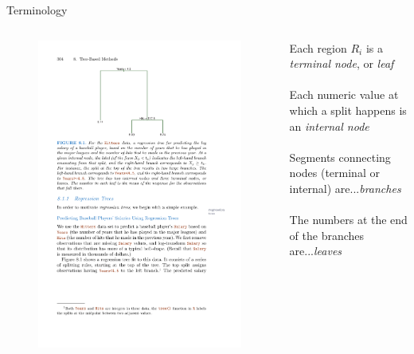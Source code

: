 \documentclass[mathserif, aspectratio=169]{beamer}
\begin{document}
\begin{frame}{Terminology}

\begin{columns}
\begin{figure}
\includegraphics[height=0.65\textheight]{simple_tree}
\caption*{}
\end{figure}



Each region $R_i$ is a \textit{terminal node}, or \textit{leaf}\\~\\

Each numeric value at which a split happens is an \textit{internal node} \\~\\

Segments connecting nodes (terminal or internal) are...\pause \textit{branches}\\~\\

\pause
The numbers at the end of the branches are...\pause \textit{leaves}

\end{columns}
\end{frame}
\end{document}
